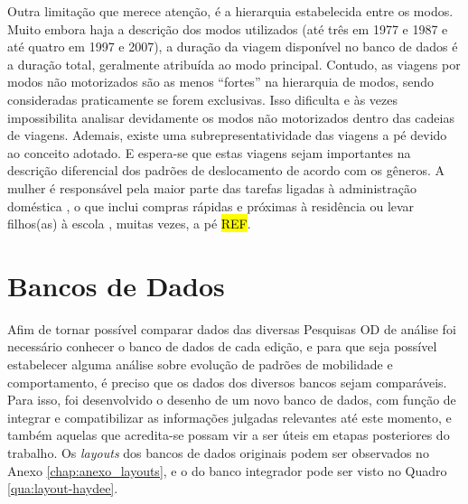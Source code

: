 Outra limitação que merece atenção, é a hierarquia estabelecida entre os modos. Muito embora haja a descrição dos modos utilizados (até três em 1977 e 1987 e até quatro em 1997 e 2007), a duração da viagem disponível no banco de dados é a duração total, geralmente atribuída ao modo principal. Contudo, as viagens por modos não motorizados são as menos ``fortes'' na hierarquia de modos, sendo consideradas praticamente se forem exclusivas. Isso dificulta e às vezes impossibilita analisar devidamente os modos não motorizados dentro das cadeias de viagens. 
Ademais, existe uma subrepresentatividade das viagens a pé devido ao conceito adotado. E espera-se que estas viagens sejam importantes na descrição diferencial dos padrões de deslocamento de acordo com os gêneros. A mulher é responsável pela maior parte das tarefas ligadas à administração doméstica \cite{ROOT1999,VANCE2007}, o que inclui compras rápidas e próximas à residência ou levar filhos(as) à escola \cite{FOX1983,FAGNANI1983,IBIPO1992,MCNUCKIN2005,SCHWANEN2002,SONG2003,CRANE2007}, muitas vezes, a pé \hl{REF}.


\section{Bancos de Dados}\label{sec:bd}

Afim de tornar possível comparar dados das diversas Pesquisas OD de análise foi necessário conhecer o banco de dados de cada edição, e para que seja possível estabelecer alguma análise sobre evolução de padrões de mobilidade e comportamento, é preciso que os dados dos diversos bancos sejam comparáveis. Para isso, foi desenvolvido o desenho de um novo banco de dados, com função de integrar e compatibilizar as informações julgadas relevantes até este momento, e também aquelas que acredita-se possam vir a ser úteis em etapas posteriores do trabalho. Os \emph{layouts} dos bancos de dados originais podem ser observados no Anexo \ref{chap:anexo_layouts}, e o do  banco integrador pode ser visto no Quadro \ref{qua:layout-haydee}.

